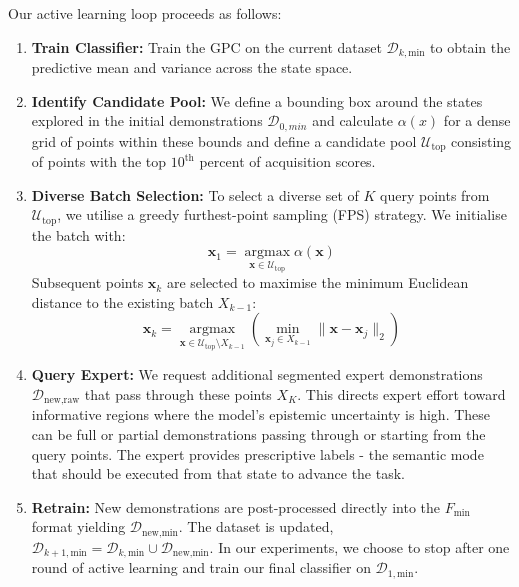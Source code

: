 \documentclass[journal]{IEEEtran}
\begin{document}
Our active learning loop proceeds as follows:
\begin{enumerate}
\item \textbf{Train Classifier:} Train the GPC on the current dataset $\mathcal{D}_{k,\text{min}}$ to obtain the predictive mean and variance across the state space.
\item \textbf{Identify Candidate Pool:} We define a bounding box around the states explored in the initial demonstrations $\mathcal{D}_{0,min}$ and calculate $\alpha(x)$ for a dense grid of points within these bounds and define a candidate pool $\mathcal{U}_{\text{top}}$ consisting of points with the top $10^{\text{th}}$ percent of acquisition scores.
\item \textbf{Diverse Batch Selection:} To select a diverse set of $K$ query points from $\mathcal{U}_{\text{top}}$, we utilise a greedy furthest-point sampling (FPS) strategy. We initialise the batch with:
\begin{equation}
\mathbf{x}_1 = \operatorname*{argmax}_{\mathbf{x} \in \mathcal{U}_{\text{top}}} \alpha(\mathbf{x})
\end{equation}
Subsequent points $\mathbf{x}_k$ are selected to maximise the minimum Euclidean distance to the existing batch $X_{k-1}$:
\begin{equation} \label{eq:sampling}
\mathbf{x}_k = \operatorname*{argmax}_{\mathbf{x} \in \mathcal{U}_{\text{top}} \setminus X_{k-1}} \left( \min_{\mathbf{x}_j \in X_{k-1}} \| \mathbf{x} - \mathbf{x}_j \|_2 \right)
\end{equation}
\item \textbf{Query Expert:} We request additional segmented expert demonstrations $\mathcal{D}_{\text{new},\text{raw}}$ that pass through these points $X_K$. This directs expert effort toward informative regions where the model's epistemic uncertainty is high. These can be full or partial demonstrations passing through or starting from the query points. The expert provides prescriptive labels - the semantic mode that should be executed from that state to advance the task.
\item \textbf{Retrain:} New demonstrations are post-processed directly into the $F_{\text{min}}$ format yielding $\mathcal{D}_{\text{new},\text{min}}$. The dataset is updated, $\mathcal{D}_{k+1,\text{min}} = \mathcal{D}_{k,\text{min}} \cup \mathcal{D}_{\text{new},\text{min}}$. In our experiments, we choose to stop after one round of active learning and train our final classifier on $\mathcal{D}_{1,\text{min}}$.
\end{enumerate}
\end{document}
